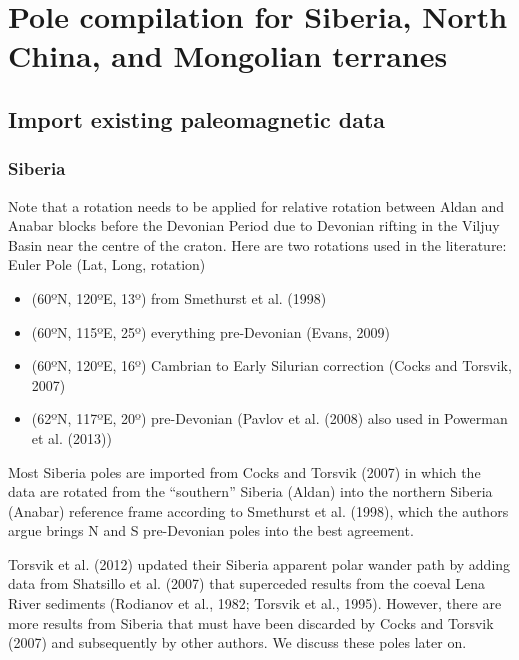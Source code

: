 \documentclass[11pt]{article}
\providecommand{\tightlist}{%
      \setlength{\itemsep}{0pt}\setlength{\parskip}{0pt}}
\begin{document}
    

    \section{Pole compilation for Siberia, North China, and Mongolian
terranes}\label{pole-compilation-for-siberia-north-china-and-mongolian-terranes}

    \subsection{Import existing paleomagnetic
data}\label{import-existing-paleomagnetic-data}

    \subsubsection{Siberia}\label{siberia}

    Note that a rotation needs to be applied for relative rotation between
Aldan and Anabar blocks before the Devonian Period due to Devonian
rifting in the Viljuy Basin near the centre of the craton. Here are two
rotations used in the literature: Euler Pole (Lat, Long, rotation)

\begin{itemize}
\tightlist
\item
  (60ºN, 120ºE, 13º) from Smethurst et al. (1998)
\item
  (60ºN, 115ºE, 25º) everything pre-Devonian (Evans, 2009)
\item
  (60ºN, 120ºE, 16º) Cambrian to Early Silurian correction (Cocks and
  Torsvik, 2007)
\item
  (62ºN, 117ºE, 20º) pre-Devonian (Pavlov et al. (2008) also used in
  Powerman et al. (2013))
\end{itemize}

Most Siberia poles are imported from Cocks and Torsvik (2007) in which
the data are rotated from the ``southern'' Siberia (Aldan) into the
northern Siberia (Anabar) reference frame according to Smethurst et al.
(1998), which the authors argue brings N and S pre-Devonian poles into
the best agreement.

    Torsvik et al. (2012) updated their Siberia apparent polar wander path
by adding data from Shatsillo et al. (2007) that superceded results from
the coeval Lena River sediments (Rodianov et al., 1982; Torsvik et al.,
1995). However, there are more results from Siberia that must have been
discarded by Cocks and Torsvik (2007) and subsequently by other authors.
We discuss these poles later on.
\end{document}
